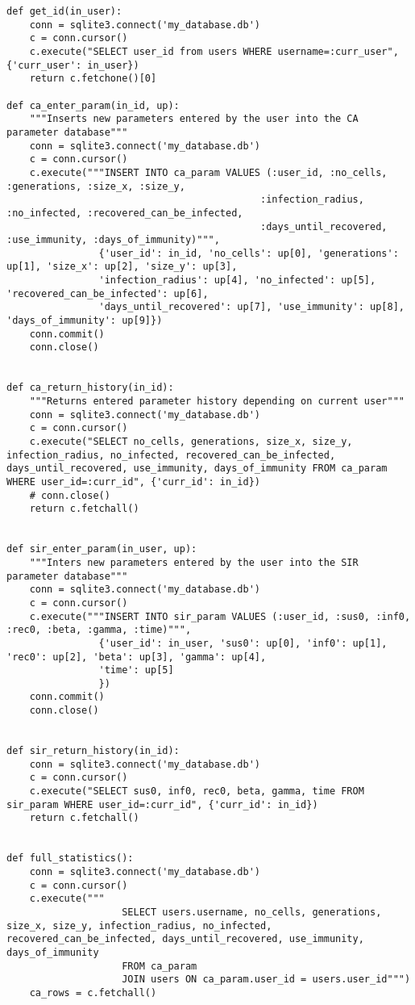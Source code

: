 \documentclass[11pt, a4paper]{article}
\begin{document}
\begin{lstlisting}
def get_id(in_user):
    conn = sqlite3.connect('my_database.db')
    c = conn.cursor()
    c.execute("SELECT user_id from users WHERE username=:curr_user", {'curr_user': in_user})
    return c.fetchone()[0]

def ca_enter_param(in_id, up):
    """Inserts new parameters entered by the user into the CA parameter database"""
    conn = sqlite3.connect('my_database.db')
    c = conn.cursor()
    c.execute("""INSERT INTO ca_param VALUES (:user_id, :no_cells, :generations, :size_x, :size_y,
                                            :infection_radius, :no_infected, :recovered_can_be_infected,
                                            :days_until_recovered, :use_immunity, :days_of_immunity)""",
                {'user_id': in_id, 'no_cells': up[0], 'generations': up[1], 'size_x': up[2], 'size_y': up[3],
                'infection_radius': up[4], 'no_infected': up[5], 'recovered_can_be_infected': up[6],
                'days_until_recovered': up[7], 'use_immunity': up[8], 'days_of_immunity': up[9]})
    conn.commit()
    conn.close()


def ca_return_history(in_id):
    """Returns entered parameter history depending on current user"""
    conn = sqlite3.connect('my_database.db')
    c = conn.cursor()
    c.execute("SELECT no_cells, generations, size_x, size_y, infection_radius, no_infected, recovered_can_be_infected, days_until_recovered, use_immunity, days_of_immunity FROM ca_param WHERE user_id=:curr_id", {'curr_id': in_id})
    # conn.close()
    return c.fetchall()


def sir_enter_param(in_user, up):
    """Inters new parameters entered by the user into the SIR parameter database"""
    conn = sqlite3.connect('my_database.db')
    c = conn.cursor()
    c.execute("""INSERT INTO sir_param VALUES (:user_id, :sus0, :inf0, :rec0, :beta, :gamma, :time)""",
                {'user_id': in_user, 'sus0': up[0], 'inf0': up[1], 'rec0': up[2], 'beta': up[3], 'gamma': up[4],
                'time': up[5]
                })
    conn.commit()
    conn.close()


def sir_return_history(in_id):
    conn = sqlite3.connect('my_database.db')
    c = conn.cursor()
    c.execute("SELECT sus0, inf0, rec0, beta, gamma, time FROM sir_param WHERE user_id=:curr_id", {'curr_id': in_id})
    return c.fetchall()


def full_statistics():
    conn = sqlite3.connect('my_database.db')
    c = conn.cursor()
    c.execute("""
                    SELECT users.username, no_cells, generations, size_x, size_y, infection_radius, no_infected, recovered_can_be_infected, days_until_recovered, use_immunity, days_of_immunity
                    FROM ca_param
                    JOIN users ON ca_param.user_id = users.user_id""")
    ca_rows = c.fetchall()


\end{lstlisting}
\end{document}
